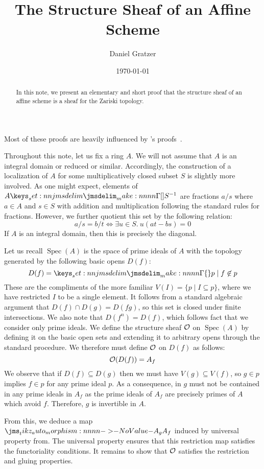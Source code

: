 \documentclass{amsart}
\title{The Structure Sheaf of an Affine Scheme}
\author{Daniel Gratzer}
\date{\today}
\DeclareMathOperator{\Spec}{Spec}
\begin{document}
\begin{abstract}
  In this note, we present an elementary and short proof that the structure sheaf of an affine
  scheme is a sheaf for the Zariski topology.
\end{abstract}
\maketitle

Most of these proofs are heavily influenced by \citeauthor{vakil:rising-sea}'s
proofs~\parencite{vakil:rising-sea}.

Throughout this note, let us fix a ring $A$. We will not assume that $A$ is an integral domain or
reduced or similar. Accordingly, the construction of a localization of $A$ for some multiplicatively
closed subset $S$ is slightly more involved. As one might expect, elements of $\Localize{A}{S}$ are
fractions $a/s$ where $a \in A$ and $s \in S$ with addition and multiplication following the
standard rules for fractions. However, we further quotient this set by the following relation:
\begin{equation}
  a/s = b/t \iff \exists u \in S.\ u(at - bs) = 0
  \label{eq:frac-rel}
\end{equation}
If $A$ is an integral domain, then this is precisely the diagonal.

Let us recall $\Spec(A)$ is the space of prime ideals of $A$ with the topology generated by the
following basic opens $D(f)$:
\[
  D(f) = \braces{p \mid f \not\in p}
\]
These are the compliments of the more familiar $V(I) = \{p \mid I \subseteq p\}$, where we have
restricted $I$ to be a single element. It follows from a standard algebraic argument that
$D(f) \cap D(g) = D(fg)$, so this set is closed under finite intersections. We also note that
$D(f^n) = D(f)$, which follows fact that we consider only prime ideals. We define the structure
sheaf $\mathcal{O}$ on $\Spec(A)$ by defining it on the basic open sets and extending it to arbitrary
opens through the standard procedure. We therefore must define $\mathcal{O}$ on $D(f)$ as follows:
\[
  \mathcal{O}(D(f)) = A_f
\]
We observe that if $D(f) \subseteq D(g)$ then we must have $V(g) \subseteq V(f)$, so $g \in p$
implies $f \in p$ for any prime ideal $p$. As a consequence, in $g$ must not be contained in any
prime ideals in $A_f$ as the prime ideals of $A_f$ are precisely primes of $A$ which avoid
$f$. Therefore, $g$ is invertible in $A$.

From this, we deduce a map $\Mor{A_g}{A_f}$ induced by universal property from. The universal
property ensures that this restriction map satisfies the functoriality conditions. It remains to
show that $\mathcal{O}$ satisfies the restriction and gluing properties.
\end{document}
